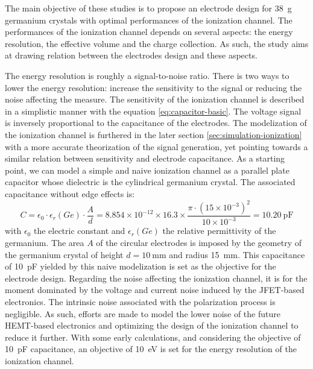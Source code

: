 The main objective of these studies is to propose an electrode design for \SI{38}{\g} germanium crystals with optimal performances of the ionization channel. The performances of the ionization channel depends on several aspects: the energy resolution, the effective volume and the charge collection. As such, the study aims at drawing relation between the electrodes design and these aspects.

The energy resolution is roughly a signal-to-noise ratio. There is two ways to lower the energy resolution: increase the sensitivity to the signal or reducing the noise affecting the measure.
The sensitivity of the ionization channel is described in a simplistic manner with the equation \ref{eq:capacitor-basic}. The voltage signal is inversely proportional to the capacitance of the electrodes. The modelization of the ionization channel is furthered in the later section \ref{sec:simulation-ionization} with a more accurate theorization of the signal generation, yet pointing towards a similar relation between sensitivity and electrode capacitance. As a starting point, we can model a simple and naive ionization channel as a parallel plate capacitor whose dielectric is the cylindrical germanium crystal. The associated capacitance without edge effects is:
\begin{equation}
\label{eq:parrallel-plate-capacitor}
C = \epsilon_0 \cdot \epsilon_r(Ge) \cdot \frac{A}{d}
=
8.854 \times 10^{-12} \times 16.3 \times \frac{\pi \cdot (15 \times 10^{-3})^2}{10 \times 10^{-3}}
=
\SI{10.20}{\pico\farad}
\end{equation}
with $\epsilon_0$ the electric constant and $\epsilon_r(Ge)$ the relative permittivity of the germanium. The area $A$ of the circular electrodes is imposed by the geometry of the germanium crystal of height $d=\SI{10}{\mm}$ and radius \SI{15}{\mm}. This capacitance of \SI{10}{\pico\farad} yielded by this naive modelization is set as the objective for the electrode design. 
Regarding the noise affecting the ionization channel, it is for the moment dominated by the voltage and current noise induced by the JFET-based electronics. The intrinsic noise associated with the polarization process is negligible. As such, efforts are made to model the lower noise of the future HEMT-based electronics and optimizing the design of the ionization channel to reduce it further. With some early calculations, and considering the objective of \SI{10}{\pico\farad} capacitance, an objective of \SI{10}{\eV} is set for the energy resolution of the ionization channel.


